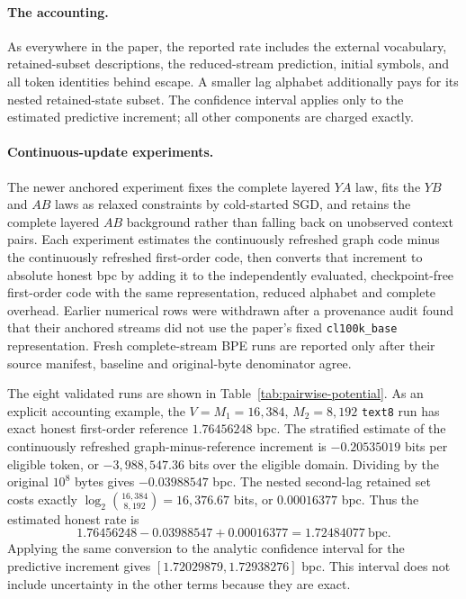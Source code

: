 \documentclass[11pt]{article}
\begin{document}
\paragraph{The accounting.}
As everywhere in the paper, the reported rate includes the external
vocabulary, retained-subset descriptions, the reduced-stream prediction,
initial symbols, and all token identities behind escape.  A smaller lag
alphabet additionally pays for its nested retained-state subset.  The
confidence interval applies only to the estimated predictive increment; all
other components are charged exactly.

\paragraph{Continuous-update experiments.}
The newer anchored experiment fixes the complete layered $YA$ law, fits the
$YB$ and $AB$ laws as relaxed constraints by cold-started SGD, and retains
the complete layered $AB$ background rather than falling back on unobserved
context pairs.  Each experiment estimates the continuously refreshed graph
code minus the continuously refreshed first-order code, then converts that
increment to absolute honest bpc by adding it to the independently evaluated,
checkpoint-free first-order code with the same representation, reduced
alphabet and complete overhead.  Earlier numerical rows were withdrawn after
a provenance audit found that their anchored streams did not use the paper's
fixed \texttt{cl100k\_base} representation.  Fresh complete-stream BPE runs
are reported only after their source manifest, baseline and original-byte
denominator agree.

The eight validated runs are shown in
Table~\ref{tab:pairwise-potential}.  As an explicit accounting example,
the $V=M_1=16{,}384$, $M_2=8{,}192$ \texttt{text8} run has exact honest
first-order reference $1.76456248$ bpc.  The stratified
estimate of the continuously refreshed graph-minus-reference increment is
$-0.20535019$ bits per eligible token, or $-3{,}988{,}547.36$ bits over the
eligible domain.  Dividing by the original $10^8$ bytes gives
$-0.03988547$ bpc.  The nested second-lag retained set costs exactly
$\log_2\binom{16{,}384}{8{,}192}=16{,}376.67$ bits, or $0.00016377$ bpc.
Thus the estimated honest rate is
\[
  1.76456248-0.03988547+0.00016377=1.72484077\ \text{bpc}.
\]
Applying the same conversion to the analytic confidence interval for the
predictive increment gives $[1.72029879,1.72938276]$ bpc.  This interval does
not include uncertainty in the other terms because they are exact.
\end{document}
